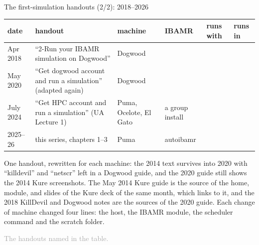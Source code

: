 \documentclass[aspectratio=169,11pt]{beamer}
\newcommand{\sourcecredit}[1]{\vfill\begin{flushright}\tiny\textcolor{DarkGray}{#1}\end{flushright}}
\begin{document}
\begin{frame}{The first-simulation handouts (2/2): 2018--2026}
\label{fr:handouts2}
\scriptsize
\renewcommand{\arraystretch}{1.12}
\setlength{\tabcolsep}{3pt}
\begin{tabular}{@{}L{0.09\textwidth}L{0.27\textwidth}L{0.13\textwidth}L{0.13\textwidth}L{0.13\textwidth}L{0.17\textwidth}@{}}
\toprule
date & handout & machine & IBAMR & runs with & runs in \\
\midrule
Apr 2018 & ``2-Run your IBAMR simulation on Dogwood'' & Dogwood &  &  &  \\
May 2020 & ``Get dogwood account and run a simulation'' (adapted again) & Dogwood &  &  &  \\
July 2024 & ``Get HPC account and run a simulation'' (UA Lecture 1) & Puma, Ocelote, El Gato & a group install &  &  \\
2025--26 & this series, chapters 1--3 & Puma & autoibamr &  &  \\
\bottomrule
\end{tabular}

\vspace{2mm}
\footnotesize One handout, rewritten for each machine: the 2014 text survives into 2020 with ``killdevil'' and ``netscr'' left in a Dogwood guide, and the 2020 guide still shows the 2014 Kure screenshots. The May 2014 Kure guide is the source of the home, module,  and  slides of the Kure deck of the same month, which links to it, and the 2018 KillDevil and Dogwood notes are the sources of the 2020 guide. Each change of machine changed four lines: the host, the IBAMR module, the scheduler command and the scratch folder.
\sourcecredit{The handouts named in the table.}
\end{frame}
\end{document}
